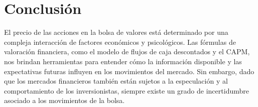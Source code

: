 \section{Conclusión}

El precio de las acciones en la bolsa de valores está determinado por una compleja interacción de factores económicos y psicológicos. Las fórmulas de valoración financiera, como el modelo de flujos de caja descontados y el CAPM, nos brindan herramientas para entender cómo la información disponible y las expectativas futuras influyen en los movimientos del mercado. Sin embargo, dado que los mercados financieros también están sujetos a la especulación y al comportamiento de los inversionistas, siempre existe un grado de incertidumbre asociado a los movimientos de la bolsa.
